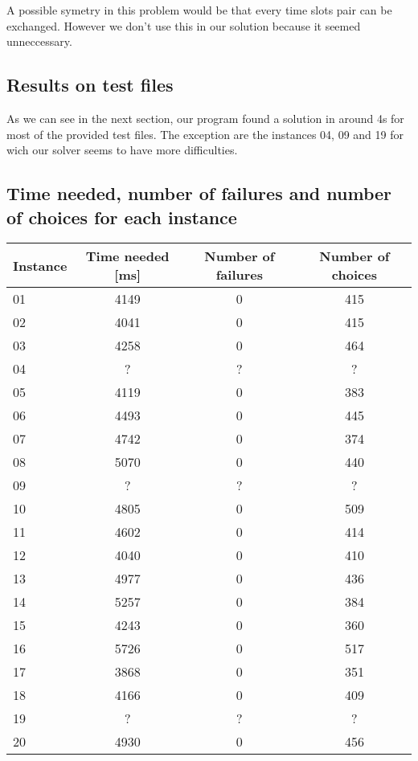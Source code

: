 \documentclass{eplDoc}
\begin{document}
A possible symetry in this problem would be that every time slots pair can be exchanged. However we don't use this in our solution because it seemed unneccessary. 

\subsection{Results on test files}

As we can see in the next section, our program found a solution in around 4s for most of the provided test files. The exception are the instances 04, 09 and 19 for wich our solver seems to have more difficulties. \\ 


\subsection{Time needed, number of failures and number of choices for each instance}
\begin{center}
		\begin{tabular}{|l|c|c|c|}
			\hline
			Instance & Time needed [ms] & Number of failures & Number of choices \\ 
			\hline
			01 & 4149 & 0 & 415 \\ 
			02 & 4041 & 0 & 415 \\ 
			03 & 4258 & 0 & 464 \\ 
			04 & ? & ? & ? \\ 
			05 & 4119 & 0 & 383 \\ 
			06 & 4493 & 0 & 445 \\ 
			07 & 4742 & 0 & 374 \\ 
			08 & 5070 & 0 & 440 \\ 
			09 & ? & ? & ? \\ 
			10 & 4805 & 0 & 509 \\ 
			11 & 4602 & 0 & 414 \\ 
			12 & 4040 & 0 & 410 \\ 
			13 & 4977 & 0 & 436 \\ 
			14 & 5257 & 0 & 384 \\ 
			15 & 4243 & 0 & 360 \\ 
			16 & 5726 & 0 & 517 \\ 
			17 & 3868 & 0 & 351 \\ 
			18 & 4166 & 0 & 409 \\ 
			19 & ? & ? & ? \\ 
			20 & 4930 & 0 & 456 \\
			\hline
		\end{tabular}
\end{center}
\end{document}
